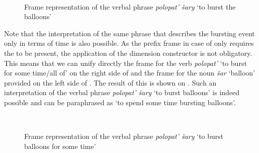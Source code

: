 \begin{figure}
\centering
{}\\
\hfill
\caption{Frame representation of the verbal phrase \textit{polopat' \v{s}ary} `to burst the balloons' \label{frame:burst:balloon}}
\end{figure}

Note that the interpretation of the same phrase that describes the bursting event only in terms of time is also possible. As the prefix frame in case of  only requires the  to be present, the application of the dimension constructor is not obligatory. This means that we can unify directly the frame for the verb \textit{polopat'} `to burst for some time/all of' on the right side of  and the frame for the noun \textit{\v{s}ar} `balloon' provided on the left side of . The result of this  is shown on . Such an interpretation of the verbal phrase \textit{polopat' \v{s}ary} `to burst balloons' is indeed possible and can be paraphrased as `to spend some time bursting balloons'. 

\begin{figure}
\centering
{}\\
\hfill
\caption{Frame representation of the verbal phrase \textit{polopat' \v{s}ary} `to burst balloons for some time' \label{frame:burst:delim}}
\end{figure}

